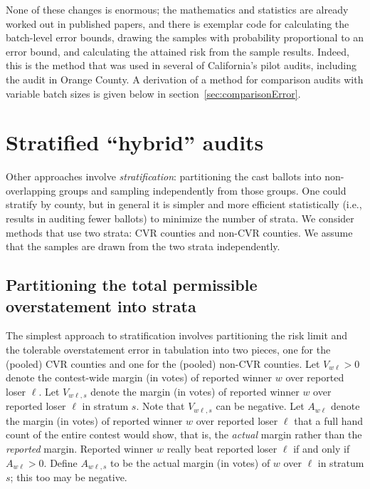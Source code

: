 \documentclass[12pt]{article}
\begin{document}
None of these changes is enormous; the mathematics and statistics are already worked out
in published papers, and there is exemplar code for calculating the
batch-level error bounds, drawing the samples with probability proportional to an
error bound, and calculating the attained risk from the sample results.
Indeed, this is the method that was used in several of California's pilot audits,
including the audit in Orange County.
A derivation of a method for comparison audits with variable batch sizes is given below
in section~\ref{sec:comparisonError}.

\section{Stratified ``hybrid'' audits}

Other approaches involve \emph{stratification}: partitioning the cast ballots
into non-overlapping groups and sampling independently from those groups.
One could stratify by county, but in general it is simpler and more efficient
statistically (i.e., results in auditing fewer ballots) to minimize the number of strata.
We consider methods that use two strata: CVR counties and non-CVR counties. 
We assume that the samples are drawn from the
two strata independently.

\subsection{Partitioning the total permissible overstatement into strata}
The simplest approach to stratification involves partitioning the risk limit and the tolerable
overstatement error in tabulation into
two pieces, one for the (pooled) CVR counties and one for the (pooled) non-CVR counties.
Let $V_{w\ell} > 0$ denote the contest-wide margin (in votes) of reported winner 
$w$ over reported loser
$\ell$.
Let $V_{w\ell,s}$ denote the margin (in votes) of reported winner $w$ over reported loser $\ell$
in stratum $s$. 
Note that $V_{w\ell,s}$ can be negative.
Let $A_{w\ell}$ denote the margin (in votes)
of reported winner $w$ over reported loser $\ell$ that 
a full hand count of the entire contest would show, that is, the \emph{actual} margin rather
than the \emph{reported} margin.
Reported winner $w$ really beat reported loser $\ell$ if and only if $A_{w\ell} > 0$.
Define $A_{w\ell,s}$ to be the actual margin (in votes) of $w$ over $\ell$ in stratum $s$;
this too may be negative.
\end{document}
